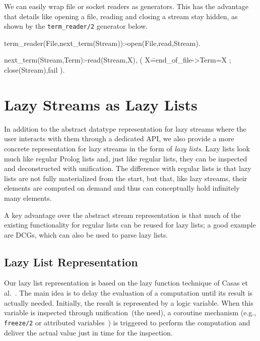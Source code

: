 \documentclass{new_tlp}
\begin{document}
We can easily wrap file or socket readers as generators. This has the
advantage that details like opening a file, reading and
closing a stream stay hidden, as shown by the 
{\tt term\_reader/2} generator below.

\begin{code}
term_reader(File,next_term(Stream)):-open(File,read,Stream).

next_term(Stream,Term):-read(Stream,X),
  ( X\==end_of_file->Term=X
  ; close(Stream),fail
  ).
\end{code}


\section{Lazy Streams as Lazy Lists}\label{ll}

In addition to the abstract datatype representation for lazy streams where the
user interacts with them through a dedicated API, we also provide a more concrete
representation for lazy streams in the form of {\em lazy lists}. Lazy lists
look much like regular Prolog lists and, just like regular lists, they can be
inspected and deconstructed with unification. The difference with regular lists
is that lazy lists are not fully materialized from the start, but that, like
lazy streams, their elements are computed on demand and thus can conceptually
hold infinitely many elements. 

A key advantage over the abstract stream representation is that much of the
existing functionality for regular lists can be reused for lazy lists; a good
example are DCGs, which can also be used to parse lazy lists.

\subsection{Lazy List Representation}

Our lazy list representation is based on the lazy function technique of Casas
et al.~\cite{lazyCiao,casas2005functional}. The main idea is to delay the
evaluation of a computation until its result is actually needed. Initially, the
result is represented by a logic variable. When this variable is inspected
through unification~(the need), a coroutine mechanism (e.g., {\tt freeze/2} or
attributed variables~\cite{holz92}) is triggered to perform the computation and
deliver the actual value just in time for the inspection.
\end{document}
